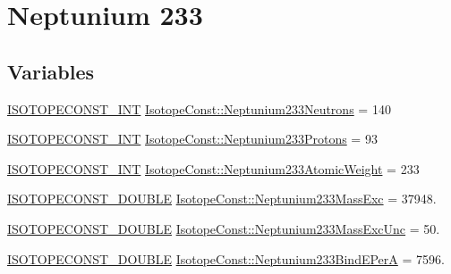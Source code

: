 \hypertarget{group___isotope_const-_neptunium-_np233}{}\section{Neptunium 233}
\label{group___isotope_const-_neptunium-_np233}
\subsection*{Variables}
\begin{DoxyCompactItemize}
\item 
\mbox{\hyperlink{group___isotope_const-_macros_ga5f18360b3e99483a35c32d789e62621c}{I\+S\+O\+T\+O\+P\+E\+C\+O\+N\+S\+T\+\_\+\+I\+NT}} \mbox{\hyperlink{group___isotope_const-_neptunium-_np233_gafdf1965f8899d4e42ce35b0013db2747}{Isotope\+Const\+::\+Neptunium233\+Neutrons}} = 140
\item 
\mbox{\hyperlink{group___isotope_const-_macros_ga5f18360b3e99483a35c32d789e62621c}{I\+S\+O\+T\+O\+P\+E\+C\+O\+N\+S\+T\+\_\+\+I\+NT}} \mbox{\hyperlink{group___isotope_const-_neptunium-_np233_ga35f4cd8ae21186d6b6694f5e289f0a17}{Isotope\+Const\+::\+Neptunium233\+Protons}} = 93
\item 
\mbox{\hyperlink{group___isotope_const-_macros_ga5f18360b3e99483a35c32d789e62621c}{I\+S\+O\+T\+O\+P\+E\+C\+O\+N\+S\+T\+\_\+\+I\+NT}} \mbox{\hyperlink{group___isotope_const-_neptunium-_np233_ga83dc204aecae69787bb43fd3e2e06b7b}{Isotope\+Const\+::\+Neptunium233\+Atomic\+Weight}} = 233
\item 
\mbox{\hyperlink{group___isotope_const-_macros_ga8f45a7272ce02c0b4c65c44636ed719a}{I\+S\+O\+T\+O\+P\+E\+C\+O\+N\+S\+T\+\_\+\+D\+O\+U\+B\+LE}} \mbox{\hyperlink{group___isotope_const-_neptunium-_np233_ga84fc7d5006fcdb3d09941c77909cb57f}{Isotope\+Const\+::\+Neptunium233\+Mass\+Exc}} = 37948.
\item 
\mbox{\hyperlink{group___isotope_const-_macros_ga8f45a7272ce02c0b4c65c44636ed719a}{I\+S\+O\+T\+O\+P\+E\+C\+O\+N\+S\+T\+\_\+\+D\+O\+U\+B\+LE}} \mbox{\hyperlink{group___isotope_const-_neptunium-_np233_ga79c4e719921fa07c5a1a3edf6655bec1}{Isotope\+Const\+::\+Neptunium233\+Mass\+Exc\+Unc}} = 50.
\item 
\mbox{\hyperlink{group___isotope_const-_macros_ga8f45a7272ce02c0b4c65c44636ed719a}{I\+S\+O\+T\+O\+P\+E\+C\+O\+N\+S\+T\+\_\+\+D\+O\+U\+B\+LE}} \mbox{\hyperlink{group___isotope_const-_neptunium-_np233_ga0d3f90053f0d17d57c5122946eba175e}{Isotope\+Const\+::\+Neptunium233\+Bind\+E\+PerA}} = 7596.
\item 

\end{DoxyCompactItemize}
